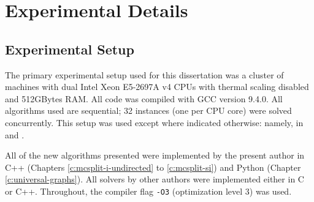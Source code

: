 
\section{Experimental Details}\label{sec:experimental-details}

\subsection{Experimental Setup}

The primary experimental setup used for this dissertation was a cluster
of machines with dual Intel Xeon E5-2697A v4 CPUs with thermal scaling disabled
and 512GBytes RAM. All code was compiled with GCC version 9.4.0.
All algorithms used are sequential; 32 instances
(one per CPU core) were solved concurrently.
This setup was used except where indicated otherwise: namely, in
 and .

All of the new algorithms presented were implemented by the present author in
C++ (Chapters \ref{c:mcsplit-i-undirected} to \ref{c:mcsplit-si})
and Python (Chapter \ref{c:universal-graphs}).  All solvers by other
authors were implemented either in C or C++.  Throughout, the 
compiler flag \texttt{-O3} (optimization level 3) was used.

